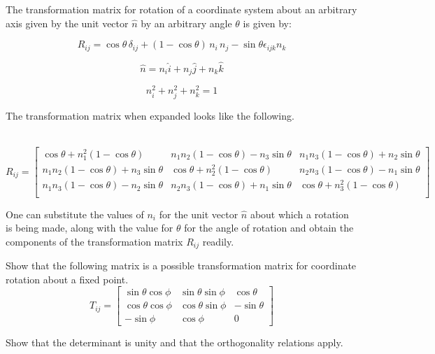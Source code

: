The transformation matrix for rotation of a coordinate system about an arbitrary axis given by the unit vector $\hat{n}$ by an arbitrary angle $\theta$ is given by:

\begin{equation}
R_{ij} = \cos\theta \, \delta_{ij} + \left( 1 - \cos \theta \right) \, n_i \, n_j - \sin\theta \epsilon_{ijk} n_k
\end{equation}

\begin{equation}
\hat{n} = n_i \hat{i} + n_j \hat{j} + n_k \hat{k}
\end{equation}

\begin{equation}
n_i^2 + n_j^2 + n_k^2 = 1
\end{equation}

The transformation matrix when expanded looks like the following.

\begin{align*}
\end{align*}

\begin{equation}
R_{ij}
= \left[ 
\begin{array}{lll}
\cos\theta + n_1^2\left( 1 - \cos\theta\right) & n_1 n_2 \left(1 - \cos\theta\right)-n_3 \sin\theta & n_1 n_3\left(1 - \cos\theta\right) + n_2 \sin\theta \\
n_1 n_2 \left( 1 - \cos\theta \right) + n_3 \sin\theta  &  \cos\theta + n_2^2 \left(1 - \cos\theta\right) & n_2 n_3\left(1 - \cos\theta\right) - n_1 \sin\theta \\
n_1 n_3 \left( 1 - \cos\theta \right) - n_2 \sin\theta & n_2 n_3 \left(1 - \cos\theta\right) + n_1 \sin\theta & \cos\theta + n_3^2 \left(1 - \cos\theta\right)  \\
\end{array}
\right] 
\end{equation}

One can substitute the values of $n_i$ for the unit vector $\hat{n}$ about which a rotation is being made, along with the value for $\theta$ for the angle of rotation and obtain the components of the transformation matrix $R_{ij}$ readily.


\begin{question}
	Show that the following matrix is a possible transformation matrix for coordinate rotation about a fixed point. 
\begin{equation}
T_{ij}
= \left[ 
\begin{array}{lll}
	\sin\theta \cos\phi & \sin\theta \sin\phi & \cos\theta \\
	\cos\theta \cos\phi & \cos\theta \sin\phi & -\sin\theta \\
	-\sin\phi & \cos\phi & 0
\end{array}
\right] 
\end{equation}

\end{question}
\begin{solution}[print]
	Show that the determinant is unity and that the orthogonality relations apply.
\end{solution}

